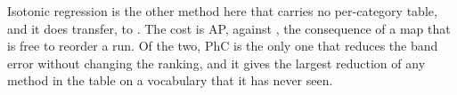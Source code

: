 Isotonic regression is the other method here that carries no per-category table, and it does
transfer, to \TRBANDISO. The cost is AP, \TRAPISO{} against \TRAPID, the consequence of a map
that is free to reorder a run. Of the two, PhC is the only one that reduces the band
error without changing the ranking, and it gives the largest reduction of any method in the table
on a vocabulary that it has never seen.
